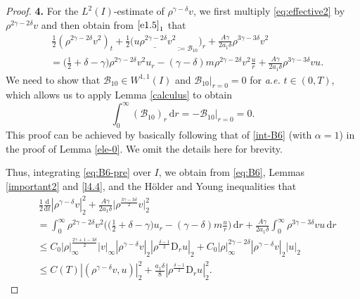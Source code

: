 \documentclass[11pt,reqno]{amsart}
\numberwithin{rk}{section}
\numberwithin{prop}{section}
\numberwithin{mydef}{section}
\numberwithin{lem}{section}
\numberwithin{equation}{section}
\numberwithin{thm}{section}
\begin{document}
\begin{proof}
\smallskip
\textbf{4.} For the $L^2(I)$-estimate of $\rho^{\gamma-\delta} v$, 
we first multiply \eqref{eq:effective2} by $\rho^{2\gamma-2\delta}v$ and then obtain from $\eqref{e1.5}_1$ that
\begin{equation}\label{eq:B6-pre}
\begin{aligned}
&\,\frac{1}{2}(\rho^{2\gamma-2\delta}v^2)_t+ \frac{1}{2} \big(\underline{u\rho^{2\gamma-2\delta}v^2}_{:=\mathcal{B}_{10}}\big)_r+\frac{A\gamma}{2a_1\delta}\rho^{3\gamma-3\delta} v^2\\
&=\big(\frac{1}{2}+\delta-\gamma\big)\rho^{2\gamma-2\delta} v^2 u_r-(\gamma-\delta)m\rho^{2\gamma-2\delta} v^2\frac{u}{r}+\frac{A\gamma}{2a_1\delta}\rho^{3\gamma-3\delta} vu.
\end{aligned}
\end{equation}
We need to show that $\mathcal{B}_{10}\in W^{1,1}(I)$ and $\mathcal{B}_{10}|_{r=0}=0$ 
for {\it a.e.} $t\in (0,T)$, which allows us to apply Lemma \ref{calculus} to obtain
\begin{equation}\label{eq:B6}
\int_0^\infty (\mathcal{B}_{10})_r\,\mathrm{d}r=-\mathcal{B}_{10}|_{r=0}=0.   
\end{equation}
This proof can be achieved by basically following that of \eqref{int-B6} (with $\alpha=1$) in the proof of Lemma \ref{ele-0}. We omit the details here for brevity.

Thus, integrating \eqref{eq:B6-pre} over $I$, we obtain from \eqref{eq:B6}, Lemmas \ref{important2} and \ref{l4.4}, and the H\"older and Young inequalities that
\begin{equation}\label{new-v}
\begin{aligned}
&\,\frac{1}{2}\frac{\mathrm{d}}{\mathrm{d}t}|\rho^{\gamma-\delta} v|_2^2+ \frac{A\gamma}{2a_1\delta} \big|\rho^\frac{3\gamma-3\delta}{2} v\big|_2^2\\
&=\int_0^\infty \rho^{2\gamma-2\delta} v^2 \Big(\big(\frac{1}{2}+\delta-\gamma\big)u_r -(\gamma-\delta)m \frac{u}{r}\Big)\,\mathrm{d}r+\frac{A\gamma}{2a_1\delta}\int_0^\infty \rho^{3\gamma-3\delta} vu\,\mathrm{d}r\\
&\leq  C_0|\rho|_\infty^\frac{2\gamma+1-3\delta}{2}|v|_\infty |\rho^{\gamma-\delta} v|_2  |\rho^\frac{\delta-1}{2}\mathrm{D}_r u|_2+C_0|\rho|_\infty^{2\gamma-2\delta} |\rho^{\gamma-\delta} v|_2 |u|_2\\
&\leq  C(T)|(\rho^{\gamma-\delta} v,u)|_2^2+\frac{a_1\delta}{8} |\rho^\frac{\delta-1}{2}\mathrm{D}_r u|_2^2. 
\end{aligned}        
\end{equation}




\end{proof}
\end{document}
